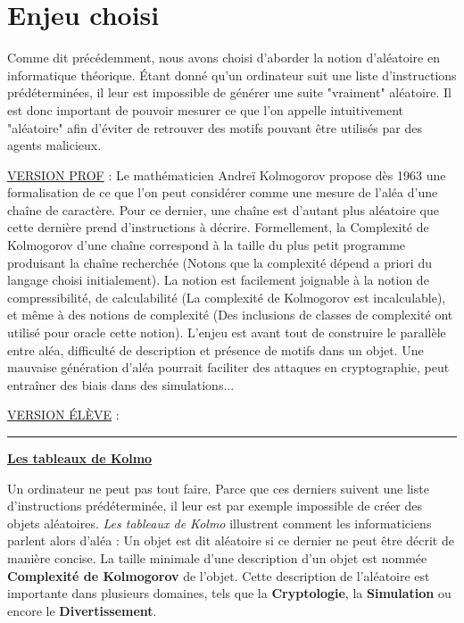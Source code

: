 \documentclass{article}
\begin{document}
\newpage

\section{Enjeu choisi}
\label{sec:enjeu}

Comme dit précédemment, nous avons choisi d'aborder la notion d'aléatoire en informatique théorique. Étant donné qu'un ordinateur suit une liste d'instructions prédéterminées, il leur est impossible de générer une suite "vraiment" aléatoire. Il est donc important de pouvoir mesurer ce que l'on appelle intuitivement "aléatoire" afin d'éviter de retrouver des motifs pouvant être utilisés par des agents malicieux.

\bigskip

\underline{VERSION PROF} : Le mathématicien Andreï Kolmogorov propose dès 1963 une formalisation de ce que l'on peut considérer comme une mesure de l'aléa d'une chaîne de caractère. Pour ce dernier, une chaîne est d'autant plus aléatoire que cette dernière prend d'instructions à décrire. Formellement, la Complexité de Kolmogorov d'une chaîne correspond à la taille du plus petit programme produisant la chaîne recherchée (Notons que la complexité dépend a priori du langage choisi initialement). La notion est facilement joignable à la notion de compressibilité, de calculabilité (La complexité de Kolmogorov est incalculable), et même à des notions de complexité (Des inclusions de classes de complexité ont utilisé pour oracle cette notion). L'enjeu est avant tout de construire le parallèle entre aléa, difficulté de description et présence de motifs dans un objet. Une mauvaise génération d'aléa pourrait faciliter des attaques en cryptographie, peut entraîner des biais dans des simulations...

\vspace{2em}

\underline{VERSION ÉLÈVE} :\\

\hrule

\vspace{2em}

\begin{center}
\Large{\textbf{\underline{Les tableaux de Kolmo}}}
\end{center}
\Large{
Un ordinateur ne peut pas tout faire. Parce que ces derniers suivent une liste d'instructions prédéterminée, il leur est par exemple impossible de créer des objets aléatoires. \textit{Les tableaux de Kolmo} illustrent comment les informaticiens parlent alors d'aléa : Un objet est dit aléatoire si ce dernier ne peut être décrit de manière concise. La taille minimale d'une description d'un objet est nommée \textbf{Complexité de Kolmogorov} de l'objet. Cette description de l'aléatoire est importante dans plusieurs domaines, tels que la \textbf{Cryptologie}, la \textbf{Simulation} ou encore le \textbf{Divertissement}.

}
\end{document}
